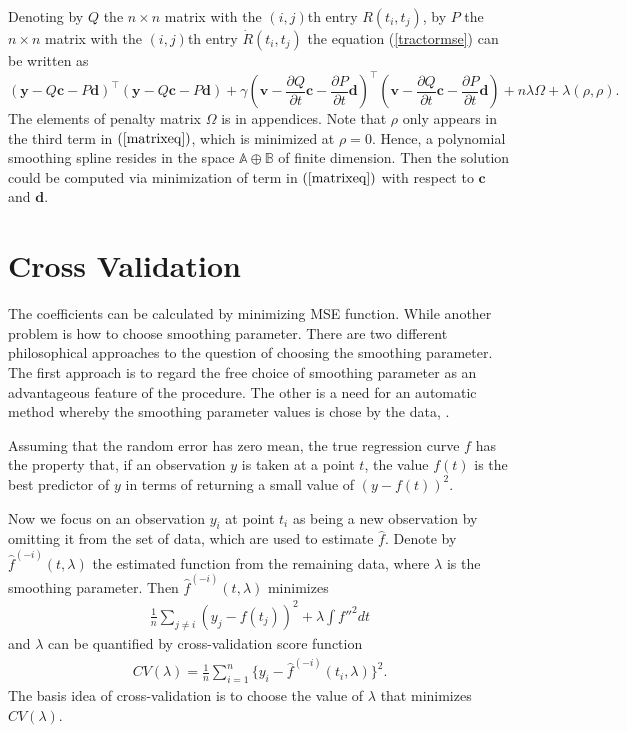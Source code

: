 Denoting by $Q$ the $n \times n$ matrix with the $(i,j)$th entry $R(t_i,t_j)$, by $P$ the $n \times n$ matrix with the $(i,j)$th entry $\dot{R}(t_i,t_j)$ the equation (\ref{tractormse}) can be written as
\begin{equation}\label{matrixeq}
(\mathbf{y}-Q\mathbf{c}-P\mathbf{d})^\top(\mathbf{y}-Q\mathbf{c}-P\mathbf{d})+\gamma (\mathbf{v}-\frac{\partial Q}{\partial t}\mathbf{c}-\frac{\partial P}{\partial t}\mathbf{d})^\top(\mathbf{v}-\frac{\partial Q}{\partial t}\mathbf{c}-\frac{\partial P}{\partial t}\mathbf{d})+n\lambda \Omega+\lambda(\rho,\rho).
\end{equation}
The elements of penalty matrix $\Omega$ is in appendices. Note that $\rho$ only appears in the third term in $(\ref{matrixeq})$, which is minimized at $\rho=0$. Hence, a polynomial smoothing spline resides in the space $\mathbb{A} \oplus \mathbb{B}$ of finite dimension. Then the solution could be computed via minimization of term in $(\ref{matrixeq})$ with respect to $\mathbf{c}$ and $\mathbf{d}$.

\section{Cross Validation}

The coefficients can be calculated by minimizing MSE function. While another problem is how to choose smoothing parameter. There are two different philosophical approaches to the question of choosing the smoothing parameter. The first approach is to regard the free choice of smoothing parameter as an advantageous feature of the procedure. The other is a need for an automatic method whereby the smoothing parameter values is chose by the data, \cite{green1993nonparametric}. 

Assuming that the random error has zero mean, the true regression curve $f$ has the property that, if an observation $y$ is taken at a point $t$, the value $f(t)$ is the best predictor of $y$ in terms of returning a small value of $(y-f(t))^2$. 

Now we focus on an observation $y_i$ at point $t_i$ as being a new observation by omitting it from the set of data, which are used to estimate $\hat{f}$. Denote by $\hat{f}^{(-i)}(t,\lambda)$ the estimated function from the remaining data, where $\lambda$ is the smoothing parameter. Then $\hat{f}^{(-i)}(t,\lambda)$ minimizes 
\begin{align}
\frac{1}{n}\sum_{j \neq i}(y_j-f(t_j))^2+\lambda \int f''^2dt
\end{align}
 and $\lambda$ can be quantified by cross-validation score function
\begin{align}
CV(\lambda)=\frac{1}{n}\sum_{i=1}^{n}\{y_i-\hat{f}^{(-i)}(t_i,\lambda)\}^2.
\end{align}
The basis idea of cross-validation is to choose the value of $\lambda$ that minimizes $CV(\lambda)$. 

